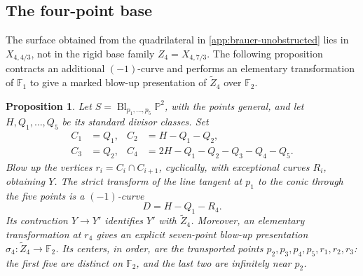 \documentclass[11pt]{article}
\theoremstyle{plain}
\newtheorem{proposition}[proposition]{Proposition}
\theoremstyle{definition}
\theoremstyle{remark}
\newcommand{\Pp}{\mathbb P}
\newcommand{\F}{\mathbb F}
\newcommand{\Bl}{\operatorname{Bl}}
\begin{document}
\subsection{The four-point base}
\label{app:explicit-base-four}

The surface obtained from the quadrilateral in
\cref{app:brauer-unobstructed} lies in \(X_{4,4/3}\), not in the
rigid base family \(Z_4=X_{4,7/3}\). The following proposition contracts
an additional \((-1)\)-curve and performs an elementary transformation of
\(\F_1\) to give a marked blow-up presentation of \(\widetilde Z_4\)
over \(\F_2\).

\begin{proposition}\label{prop:explicit-base-four}
Let \(S=\Bl_{p_1,\ldots,p_5}\Pp^2\), with the points general, and
let \(H,Q_1,\ldots,Q_5\) be its standard divisor classes. Set
\[
\begin{aligned}
C_1&=Q_1,& C_2&=H-Q_1-Q_2,\\
C_3&=Q_2,& C_4&=2H-Q_1-Q_2-Q_3-Q_4-Q_5.
\end{aligned}
\]
Blow up the vertices \(r_i=C_i\cap C_{i+1}\), cyclically, with
exceptional curves \(R_i\), obtaining \(Y\). The strict transform
of the line tangent at \(p_1\) to the conic through the five points
is a \((-1)\)-curve
\[
D=H-Q_1-R_4.
\]
Its contraction \(Y\to Y'\) identifies \(Y'\) with
\(\widetilde Z_4\). Moreover, an elementary transformation at \(r_4\)
gives an explicit seven-point blow-up presentation
\(\sigma_4:\widetilde Z_4\to\F_2\). Its centers, in order, are
the transported points \(p_2,p_3,p_4,p_5,r_1,r_2,r_3\): the first
five are distinct on \(\F_2\), and the last two are infinitely near
\(p_2\).
\end{proposition}
\end{document}
